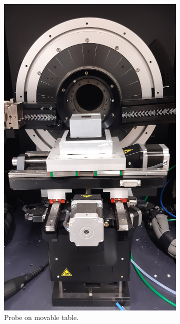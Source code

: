 \begin{figure}
  \hfill
  \begin{subfigure}{0.46\textwidth}
    \includegraphics[width=\textwidth, angle=270]{images/probe.jpg}
    \caption{Probe on movable table.}
    \label{fig:probe}
  \end{subfigure}
  \hfill
  \begin{subfigure}{0.46\textwidth}

\end{subfigure}
\end{figure}
